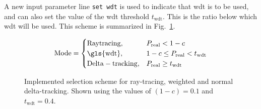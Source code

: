 A new input parameter line \verb|set wdt| is used to indicate that
\gls{wdt} is to be used, and can also set the value of the \gls{wdt}
threshold $t_{\mathrm{wdt}}$. This is the ratio below which \gls{wdt} will be used. This
scheme is summarized in Fig.~\ref{fig:ray_wdt}.
\begin{figure}[hbtp]
  \centering
  \begin{align*}
    \mathrm{Mode} =
    \begin{cases}
      \mathrm{Ray tracing}, & P_\mathrm{real} < 1-c \\
      \mathrm{\gls{wdt}}, & 1-c \leq P_\mathrm{real} < t_{\mathrm{wdt}}
      \\
      \mathrm{Delta-tracking}, & P_\mathrm{real} \geq t_{\mathrm{wdt}}
    \end{cases}
  \end{align*}
  \caption[Implemented selection scheme for ray-tracing, weighted and normal
    delta-tracking.]{Implemented selection scheme for ray-tracing, weighted and normal
    delta-tracking. Shown using the values of $(1-c)=0.1$ and $t_{\mathrm{wdt}}=0.4$.}
  \label{fig:ray_wdt}
\end{figure}



